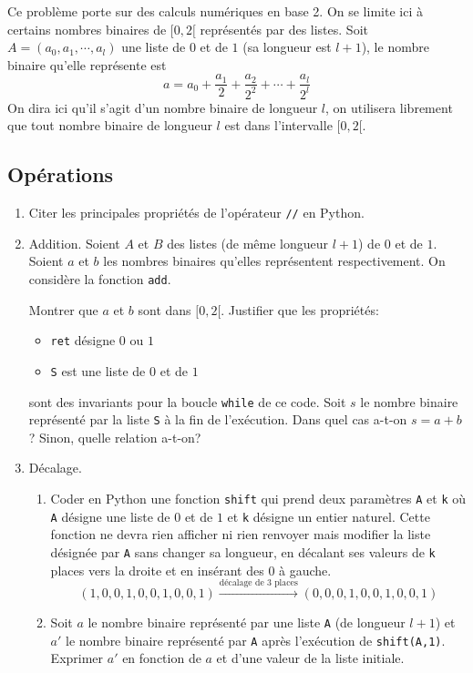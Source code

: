 Ce problème porte sur des calculs numériques en base 2. On se limite ici à certains nombres binaires  de $[0,2[$ représentés par des listes.\newline
Soit $A=(a_0,a_1,\cdots,a_l)$ une liste de $0$ et de $1$ (sa longueur est $l+1$), le nombre binaire qu'elle représente est
\begin{displaymath}
  a = a_0 + \frac{a_1}{2}+ \frac{a_2}{2^2}+\cdots + \frac{a_l}{2^{l}}
\end{displaymath}
On dira ici qu'il s'agit d'un nombre binaire de longueur $l$, on utilisera librement que tout nombre binaire de longueur $l$ est dans l'intervalle $[0,2[$.
\subsection{Opérations}
\begin{enumerate}
  \item Citer les principales propriétés de l'opérateur \texttt{//} en Python.
  \item Addition.\newline
  Soient $A$ et $B$ des listes (de même longueur $l+1$) de $0$ et de $1$. Soient $a$ et $b$ les nombres binaires qu'elles représentent respectivement. On considère la fonction \texttt{add}.

Montrer que $a$ et $b$ sont dans $[0,2[$. Justifier que les propriétés:
\begin{itemize}
  \item \og \texttt{ret} désigne $0$ ou $1$\fg 
  \item \og \texttt{S} est une liste de $0$ et de $1$\fg
\end{itemize}
sont des invariants pour la boucle \texttt{while} de ce code. Soit $s$ le nombre binaire représenté par la liste \texttt{S} à la fin de l'exécution. Dans quel cas a-t-on $s = a+b$? Sinon, quelle relation a-t-on?

\item Décalage. 
\begin{enumerate}
  \item Coder en Python une fonction \texttt{shift} qui prend deux paramètres \texttt{A} et \texttt{k} où \texttt{A} désigne une liste de $0$ et de $1$ et \texttt{k} désigne un entier naturel. Cette fonction ne devra rien afficher ni rien renvoyer mais modifier la liste désignée par \texttt{A} sans changer sa longueur, en décalant ses valeurs de \texttt{k} places vers la droite et en insérant des $0$ à gauche.
\begin{displaymath}
  (1,0,0,1,0,0,1,0,0,1)\xrightarrow{\text{décalage de 3 places}}(0,0,0,1,0,0,1,0,0,1)
\end{displaymath}
  \item Soit $a$ le nombre binaire représenté par une liste \texttt{A} (de longueur $l+1$) et $a'$ le nombre binaire représenté par \texttt{A} après l'exécution de \texttt{shift(A,1)}. Exprimer $a'$ en fonction de $a$ et d'une valeur de la liste initiale.
\end{enumerate}


\end{enumerate}
